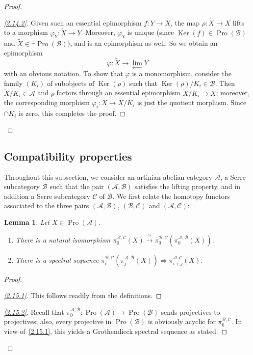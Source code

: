 \documentclass[11pt]{article}
\newtheorem{lemm}[theo]{Lemma}
\theoremstyle{definition}
\newenvironment{proofc}{\begin{proof}}{\end{proof}}
\numberwithin{equation}{section}
\newcommand\cA{{\mathcal A}}
\newcommand\cB{{\mathcal B}}
\newcommand\cC{{\mathcal C}}
\newcommand\tX{{\widetilde X}}
\DeclareMathOperator{\Ker}{Ker}
\DeclareMathOperator{\Pro}{Pro}
\newenvironment{step}[1]{\begin{proof}[#1]}{\let\qed\relax\end{proof}}
\newenvironment{laststep}[1]{\begin{proof}[#1]}{\end{proof}}
\renewenvironment{proofc}{\begin{proof}}{\end{proof}}
\theoremstyle{remark}
\newcommand*{\romanenumi}{}%
\begin{document}
\begin{proofc}
\begin{laststep}{\eqref{2.14.2}}
Given such an essential epimorphism $f : Y \to X$, the map $\rho : \tX \to X$ lifts to a morphism $\varphi_Y : \tX \to Y$. Moreover, $\varphi_Y$ is unique (since $\Ker(f) \in \Pro(\cB)$ and $\tX \in {^{\perp} \Pro(\cB)}$), and is an epimorphism as well. So we obtain an epimorphism
\[
\varphi : \tX \longrightarrow
\lim_{\leftarrow} Y
\]
with an obvious notation. To show that $\varphi$ is a monomorphism, consider the family $(K_i)$ of subobjects of $\Ker(\rho)$ such that $\Ker(\rho)/K_i \in \cB$. Then $\tX/K_i \in \cA$ and $\rho$ factors through an essential epimorphism $\tX/K_i \to X$; moreover, the corresponding morphism $\varphi_i : \tX \to \tX/K_i$ is just the quotient morphism. Since $\cap K_i$ is zero, this completes the proof.
\end{laststep}
\let\qed\relax
\end{proofc}

\subsection{Compatibility properties}\label{subsec:compatibility}

Throughout this subsection, we consider an artinian abelian category $\cA$, a Serre subcategory $\cB$ such that the pair $(\cA,\cB)$ satisfies the lifting property, and in addition a Serre subcategory $\cC$ of $\cB$. We first relate the homotopy functors associated to the three pairs $(\cA,\cB)$, $(\cB,\cC)$ and $(\cA,\cC)$:

\begin{lemm}\label{lem:comp}
Let $X \in \Pro(\cA)$.
\begin{enumerate}\romanenumi
\item \label{2.15.1} There is a natural isomorphism $\pi_0^{\cA,\cC}(X) \stackrel{\cong}{\to}
\pi_0^{\cB,\cC} (\pi_0^{\cA,\cB}(X))$.
\item \label{2.15.2} There is a spectral sequence $\pi_i^{\cB,\cC} (\pi_j^{\cA,\cB}(X)) \Rightarrow
\pi_{i+j}^{\cA,\cC}(X)$.
\end{enumerate}
\end{lemm}

\begin{proofc}
\begin{step}{\eqref{2.15.1}}%
This follows readily from the definitions.
\end{step}

\begin{laststep}{\eqref{2.15.2}}%
Recall that $\pi_0^{\cA,\cB} : \Pro(\cA) \to \Pro(\cB)$ sends projectives to projectives; also, every projective in $\Pro(\cB)$ is obviously acyclic for $\pi_0^{\cB,\cC}$. In view of~\eqref{2.15.1}, this yields a Grothendieck spectral sequence as stated.
\end{laststep}
\let\qed\relax
\end{proofc}
\end{document}
